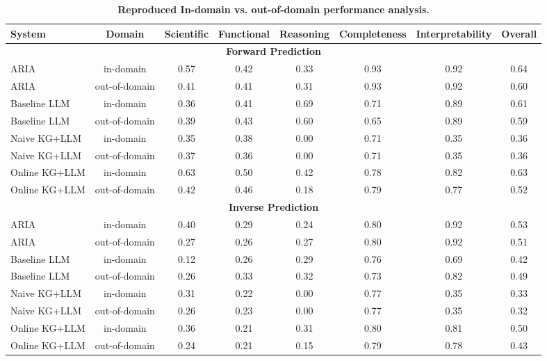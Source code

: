 \begin{table}[ht!]
\centering
\caption{\textbf{Reproduced In-domain vs. out-of-domain performance analysis.}}
\label{tab:reproduced_results}
\begin{tabular}{lccccccc}
\toprule
\textbf{System} & \textbf{Domain} & \textbf{Scientific} & \textbf{Functional} & \textbf{Reasoning} & \textbf{Completeness} & \textbf{Interpretability} & \textbf{Overall} \\
\midrule
\multicolumn{8}{c}{\textbf{Forward Prediction}} \\
\midrule
ARIA & in-domain & 0.57 & 0.42 & 0.33 & 0.93 & 0.92 & 0.64 \\
ARIA & out-of-domain & 0.41 & 0.41 & 0.31 & 0.93 & 0.92 & 0.60 \\
Baseline LLM & in-domain & 0.36 & 0.41 & 0.69 & 0.71 & 0.89 & 0.61 \\
Baseline LLM & out-of-domain & 0.39 & 0.43 & 0.60 & 0.65 & 0.89 & 0.59 \\
Naive KG+LLM & in-domain & 0.35 & 0.38 & 0.00 & 0.71 & 0.35 & 0.36 \\
Naive KG+LLM & out-of-domain & 0.37 & 0.36 & 0.00 & 0.71 & 0.35 & 0.36 \\
Online KG+LLM & in-domain & 0.63 & 0.50 & 0.42 & 0.78 & 0.82 & 0.63 \\
Online KG+LLM & out-of-domain & 0.42 & 0.46 & 0.18 & 0.79 & 0.77 & 0.52 \\
\multicolumn{8}{c}{\textbf{Inverse Prediction}} \\
\midrule
ARIA & in-domain & 0.40 & 0.29 & 0.24 & 0.80 & 0.92 & 0.53 \\
ARIA & out-of-domain & 0.27 & 0.26 & 0.27 & 0.80 & 0.92 & 0.51 \\
Baseline LLM & in-domain & 0.12 & 0.26 & 0.29 & 0.76 & 0.69 & 0.42 \\
Baseline LLM & out-of-domain & 0.26 & 0.33 & 0.32 & 0.73 & 0.82 & 0.49 \\
Naive KG+LLM & in-domain & 0.31 & 0.22 & 0.00 & 0.77 & 0.35 & 0.33 \\
Naive KG+LLM & out-of-domain & 0.26 & 0.23 & 0.00 & 0.77 & 0.35 & 0.32 \\
Online KG+LLM & in-domain & 0.36 & 0.21 & 0.31 & 0.80 & 0.81 & 0.50 \\
Online KG+LLM & out-of-domain & 0.24 & 0.21 & 0.15 & 0.79 & 0.78 & 0.43 \\
\bottomrule
\end{tabular}
\end{table}